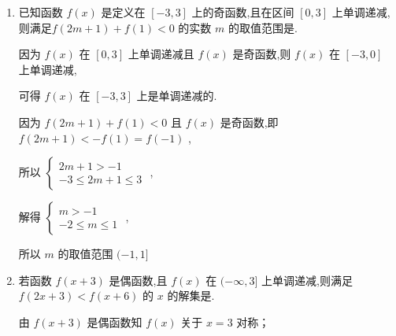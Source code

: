 \begin{enumerate}
\begin{jieda}
         $\therefore$ 当 $1 < {x}_{1} < {x}_{2}$ 时, $f\left( {x}_{2}\right)  - f\left( {x}_{1}\right)  > 0$ ,即 $f\left( {x}_{2}\right)  > f\left( {x}_{1}\right)$ ,
        
        $\therefore$ 函数 $f\left( x\right)$ 在 $\left( {1, + \infty }\right)$ 上为单调增函数,
        
         $\because$ 函数 $f\left( {x + 1}\right)$ 是偶函数,即 $f\left( {1 + x}\right)  = f\left( {1 - x}\right)$ ,
        
        $\therefore$ 函数 $f\left( x\right)$ 的图象关于直线 $x = 1$ 对称, $\therefore a = f\left( {-\dfrac{1}{2}}\right)  = f\left( \dfrac{5}{2}\right)$ ,
        
        又函数 $f\left( x\right)$ 在 $\left( {1, + \infty }\right)$ 上为单调增函数, $\therefore f\left( 2\right)  < f\left( \dfrac{5}{2}\right)  < f\left( 3\right)$ ,
        
        即 $f\left( 2\right)  < f\left( {-\dfrac{1}{2}}\right)  < f\left( 3\right) ,\therefore b < a < c$ 
    \end{jieda}
    \item 已知函数 $f\left( x\right)$ 是定义在 $\left\lbrack  {-3,3}\right\rbrack$ 上的奇函数,且在区间 $\left\lbrack  {0,3}\right\rbrack$ 上单调递减,则满足$f\left( {{2m} + 1}\right)  + f\left( 1\right)  < 0$ 的实数 $m$ 的取值范围是.
    \begin{jieda}
        因为 $f\left( x\right)$ 在 $\left\lbrack  {0,3}\right\rbrack$ 上单调递减且 $f\left( x\right)$ 是奇函数,则 $f\left( x\right)$ 在 $\left\lbrack  {-3,0}\right\rbrack$ 上单调递减,
        
        可得 $f\left( x\right)$ 在 $\left\lbrack  {-3,3}\right\rbrack$ 上是单调递减的.
        
        因为 $f\left( {{2m} + 1}\right)  + f\left( 1\right)  < 0$ 且 $f\left( x\right)$ 是奇函数,即 $f\left( {{2m} + 1}\right)  <  - f\left( 1\right)  = f\left( {-1}\right)$ ,
        
        所以 $\left\{  \begin{matrix} {2m} + 1 >  - 1 \\   - 3 \leq  {2m} + 1 \leq  3 \end{matrix}\right.$ ,
        
        解得 $\left\{  \begin{matrix} m >  - 1 \\   - 2 \leq  m \leq  1 \end{matrix}\right.$ ,
        
         所以 $m$ 的取值范围 $( - 1,1\rbrack$
    \end{jieda}
    \item 若函数 $f\left( {x + 3}\right)$ 是偶函数,且 $f\left( x\right)$ 在 $( - \infty ,3\rbrack$ 上单调递减,则满足 $f\left( {{2x} + 3}\right)  < f\left( {x + 6}\right)$ 的 $x$ 的解集是.
    \begin{jieda}
        由 $f\left( {x + 3}\right)$ 是偶函数知 $f\left( x\right)$ 关于 $x = 3$ 对称；
        

\end{jieda}
\end{enumerate}
